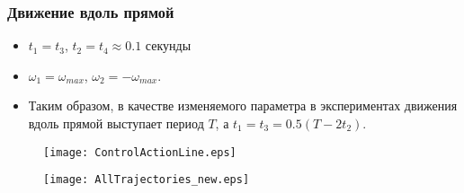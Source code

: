 \begin{frame}
\frametitle{Движение вдоль прямой}

\begin{minipage}[t]{0.6\linewidth}
	\begin{itemize}
		\item $t_1=t_3$, $ t_2 = t_4 \approx 0.1 $ секунды
		\item $ \omega_1 = \omega_{max} $, $ \omega_2 = -\omega_{max} $. 
		\item Таким образом, в качестве изменяемого параметра в экспериментах движения вдоль прямой выступает период $ T $, а $t_1=t_3 = 0.5(T - 2t_2)$. 
		
		
	\end{itemize}	
\end{minipage}
\hfill
\begin{minipage}[t]{0.37\linewidth}
	\begin{figure}[!ht]
		\centering
		\texttt{[image: ControlActionLine.eps]}
	\end{figure}
	
\end{minipage}	

\begin{figure}[!ht]
	\centering
	\texttt{[image: AllTrajectories\_new.eps]}
\end{figure}




\end{frame}


%


